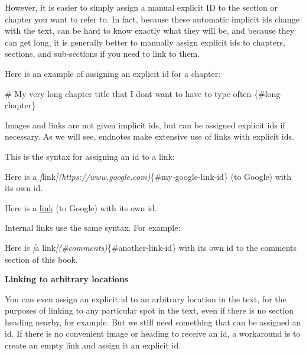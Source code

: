 \documentclass[
]{book}
\newenvironment{Shaded}{\begin{snugshade}}{\end{snugshade}}
\newcommand{\CommentTok}[1]{\textcolor[rgb]{0.56,0.35,0.01}{\textit{#1}}}
\newcommand{\FunctionTok}[1]{\textcolor[rgb]{0.00,0.00,0.00}{#1}}
\newcommand{\NormalTok}[1]{#1}
\newcommand{\OtherTok}[1]{\textcolor[rgb]{0.56,0.35,0.01}{#1}}
\begin{document}
However, it is easier to simply assign a manual explicit ID to the section or chapter you want to refer to. In fact, because these automatic implicit ids change with the text, can be hard to know exactly what they will be, and because they can get long, it is generally better to manually assign explicit ids to chapters, sections, and sub-sections if you need to link to them.

Here is an example of assigning an explicit id for a chapter:

\begin{Shaded}
\begin{Highlighting}[]
\FunctionTok{\# My very long chapter title that I don\textquotesingle{}t want to have to type often \{\#long{-}chapter\}}
\end{Highlighting}
\end{Shaded}

Images and links are not given implicit ids, but can be assigned explicit ids if necessary. As we will see, endnotes make extensive use of links with explicit ids.

This is the syntax for assigning an id to a link:

\begin{Shaded}
\begin{Highlighting}[]
\NormalTok{Here is a }\CommentTok{[}\OtherTok{link}\CommentTok{](https://www.google.com)}\NormalTok{\{\#my{-}google{-}link{-}id\} (to Google) with its own id.}
\end{Highlighting}
\end{Shaded}

Here is a \protect\hypertarget{my-link-id}{\href{https://www.google.com}{link}} (to Google) with its own id.

Internal links use the same syntax. For example:

\begin{Shaded}
\begin{Highlighting}[]
\NormalTok{Here is }\CommentTok{[}\OtherTok{a link}\CommentTok{](\#comments)}\NormalTok{\{\#another{-}link{-}id\} with its own id to the comments section of this book.}
\end{Highlighting}
\end{Shaded}

\textbf{Linking to arbitrary locations}

You can even assign an explicit id to an arbitrary location in the text, for the purposes of linking to any particular spot in the text, even if there is no section heading nearby, for example. But we still need something that can be assigned an id. If there is no convenient image or heading to receive an id, a workaround is to create an empty link and assign it an explicit id.
\end{document}
